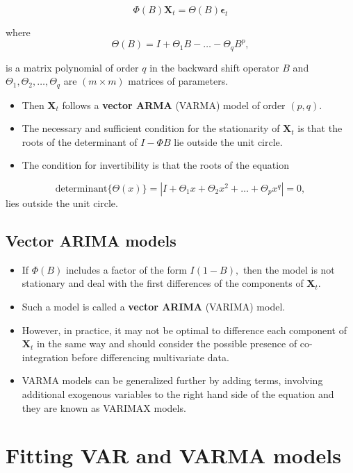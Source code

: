 \documentclass[]{book}
\providecommand{\tightlist}{%
  \setlength{\itemsep}{0pt}\setlength{\parskip}{0pt}}
\begin{document}
\[\Phi(B)\mathbf{X}_t=\Theta(B)\symbf{\epsilon}_t\]

where
\[\Theta(B)=I+\Theta_1 B-\dots-\Theta_qB^p,\]

is a matrix polynomial of order \(q\) in the backward shift operator \(B\) and \(\Theta_1, \Theta_2,\dots, \Theta_q\) are \((m\times m)\) matrices of parameters.

\begin{itemize}
\tightlist
\item
  Then \(\mathbf{X}_t\) follows a \textbf{vector ARMA} (VARMA) model of order \((p,q).\)
\item
  The necessary and sufficient condition for the stationarity of \(\mathbf{X}_t\) is that the roots of the determinant of \(I-\Phi B\) lie outside the unit circle.
\item
  The condition for invertibility is that the roots of the equation
\end{itemize}

\[\text{determinant}\{\Theta(x)\}=|I+\Theta_1x+\Theta_2x^2+\dots+\Theta_px^q|=0,\]
lies outside the unit circle.

\hypertarget{vector-arima-models}{%
\subsection{Vector ARIMA models}\label{vector-arima-models}}

\begin{itemize}
\tightlist
\item
  If \(\Phi(B)\) includes a factor of the form \(I(1-B),\) then the model is not stationary and deal with the first differences of the components of \(\mathbf{X}_t\).
\item
  Such a model is called a \textbf{vector ARIMA} (VARIMA) model.
\item
  However, in practice, it may not be optimal to difference each component of \(\mathbf{X}_t\) in the same way and should consider the possible presence of co-integration before differencing multivariate data.
\item
  VARMA models can be generalized further by adding terms, involving additional exogenous variables to the right hand side of the equation and they are known as VARIMAX models.
\end{itemize}

\hypertarget{fitting-var-and-varma-models}{%
\section{Fitting VAR and VARMA models}\label{fitting-var-and-varma-models}}
\end{document}

